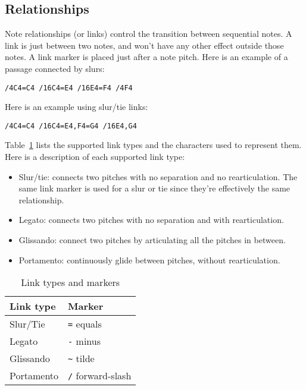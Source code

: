 \documentclass{scrartcl}
\begin{document}
\subsection{Relationships}
Note relationships (or links) control the transition between sequential notes. A link is just between two notes, and won't have any other effect outside those notes. A link marker is placed just after a note pitch. Here is an example of a passage connected by slurs:
\begin{center}
\verb|/4C4=C4 /16C4=E4 /16E4=F4 /4F4|
\end{center}
Here is an example using slur/tie links:
\begin{center}
\verb|/4C4=C4 /16C4=E4,F4=G4 /16E4,G4|
\end{center}
Table~\ref{tab:link_markers} lists the supported link types and the characters used to represent them. Here is a description of each supported link type:
\begin{itemize}
\item Slur/tie: connects two pitches with no separation and no rearticulation. The same link marker is used for a slur or tie since they're effectively the same relationship.
\item Legato: connects two pitches with no separation and with rearticulation.
\item Glissando: connect two pitches by articulating all the pitches in between.
\item Portamento: continuously glide between pitches, without rearticulation.
\end{itemize}
\begin{table}[ht]
\begin{center}
  \begin{tabular}{ l | l}
    \hline
    \textbf{Link type} & \textbf{Marker} \\ \hline
    Slur/Tie & \verb|=| \hspace{.1cm} equals \\ \hline
    Legato & \verb|-| \hspace{.1cm} minus \\ \hline
    Glissando & \verb|~| \hspace{.1cm} tilde \\ \hline
    Portamento & \verb|/| \hspace{.1cm} forward-slash \\ \hline
    \hline
  \end{tabular}
\end{center}
\caption{Link types and markers}
\label{tab:link_markers}
\end{table}
\end{document}
